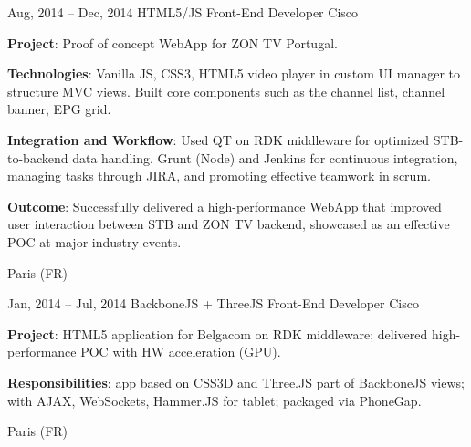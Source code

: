 \documentclass[
  a4paper,
   maincolor=cvblue,
   sectioncolor=cvblue,
   sidebarwidth=0.323\paperwidth,
]{fortysecondscv}
\begin{document}
\begin{cvtableNew}
  \cvitemRightNew
    {Aug, 2014 – Dec, 2014} %
    {HTML5/JS Front-End Developer} %
    {Cisco} %
    {
      \vspace{1pt} %
      \textbf{Project}: Proof of concept WebApp for ZON TV Portugal.\par
      \vspace{4pt}
      \textbf{Technologies}: Vanilla JS, CSS3, HTML5 video player in custom UI manager to structure MVC views. Built core components such as the channel list, channel banner, EPG grid.\par
      \vspace{4pt}
      \textbf{Integration and Workflow}: Used QT on RDK middleware for optimized STB-to-backend data handling. Grunt (Node) and Jenkins for continuous integration, managing tasks through JIRA, and promoting effective teamwork in scrum.\par
      \vspace{4pt}
      \textbf{Outcome}: Successfully delivered a high-performance WebApp that improved user interaction between STB and ZON TV backend, showcased as an effective POC at major industry events.
    }
    {Paris (FR)} %
\end{cvtableNew}











\newpage
\makethirdsidebar

\vspace*{-1em} %
\begin{cvtableNew}
  \cvitemRightNew
    {Jan, 2014 – Jul, 2014} %
    {BackboneJS + ThreeJS Front-End Developer} %
    {Cisco} %
    {
      \vspace{1pt}
      \textbf{Project}: HTML5 application for Belgacom on RDK middleware; delivered high-performance POC with HW acceleration (GPU).\par
      \vspace{4pt}
      \textbf{Responsibilities}: app based on CSS3D and Three.JS part of BackboneJS views; with AJAX, WebSockets, Hammer.JS for tablet; packaged via PhoneGap.\par
    }
    {Paris (FR)} %
\end{cvtableNew}
\end{document}
